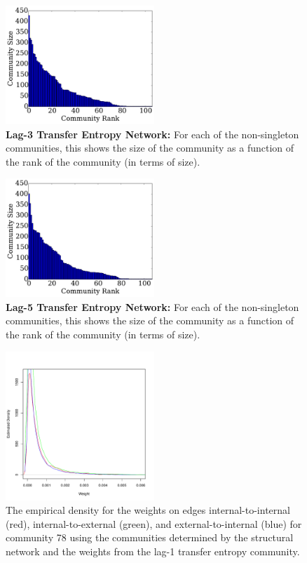 \documentclass[]{article}
\begin{document}
\begin{figure}[h!]
  \centering
\includegraphics[width=0.50\textwidth]{Figures/comm-oslom3.pdf}
\caption{\textbf{Lag-3 Transfer Entropy Network:} For each of the non-singleton communities, this shows the size of the community as a function of the rank of the community (in terms of size).}
\label{Fig-}
\end{figure}

\begin{figure}[h!]
  \centering
\includegraphics[width=0.50\textwidth]{Figures/comm-oslom5.pdf}
\caption{\textbf{Lag-5 Transfer Entropy Network:} For each of the non-singleton communities, this shows the size of the community as a function of the rank of the community (in terms of size).}
\label{Fig-}
\end{figure}

\begin{figure}[h!]
  \centering
\includegraphics[width=0.50\textwidth]{Figures/comm78_labels-struc_weights-TE1-dens.pdf}
\caption{The empirical density for the weights on edges internal-to-internal (red), internal-to-external (green), and external-to-internal (blue) for community 78 using the communities determined by the structural network and the weights from the lag-1 transfer entropy community.}
\label{Fig-}
\end{figure}
\end{document}
